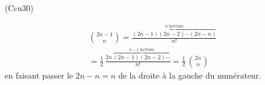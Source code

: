 \begin{tiny}(Ccu30)\end{tiny} 
\begin{multline*}
 \binom{2n-1}{n} = \frac{\overset{n \text{ facteurs}}{\overbrace{(2n-1)(2n-2)\cdots (2n-n)}}}{n!} \\
 = \frac{1}{2}\,\frac{2n\,\overset{n-1 \text{ facteurs}}{\overbrace{(2n-1)(2n-2)\cdots}}}{n!}
 = \frac{1}{2}\,\binom{2n}{n}
\end{multline*}
en faisant passer le $2n -n = n$ de la droite à la gauche du numérateur.